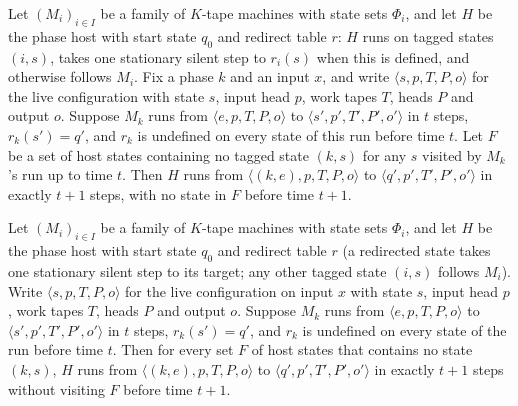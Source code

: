 \begin{theorem}
\label{Turing.NTimeDiag.qy_hosted'}
\leanok
{}
Let $(M_i)_{i \in I}$ be a family of $K$-tape machines with state sets $\Phi_i$, and let $H$ be
the phase host with start state $q_0$ and redirect table $r$: $H$ runs on tagged states
$(i, s)$, takes one stationary silent step to $r_i(s)$ when this is defined, and otherwise
follows $M_i$. Fix a phase $k$ and an input $x$, and write $\langle s, p, T, P, o\rangle$ for the
live configuration with state $s$, input head $p$, work tapes $T$, heads $P$ and output $o$.
Suppose $M_k$ runs from $\langle e, p, T, P, o\rangle$ to $\langle s', p', T', P', o'\rangle$ in
$t$ steps, $r_k(s') = q'$, and $r_k$ is undefined on every state of this run before time $t$.
Let $F$ be a set of host states containing no tagged state $(k, s)$ for any $s$ visited by
$M_k$'s run up to time $t$. Then $H$ runs from $\langle (k, e), p, T, P, o\rangle$ to
$\langle q', p', T', P', o'\rangle$ in exactly $t + 1$ steps, with no state in $F$ before time
$t + 1$.
\end{theorem}

\begin{theorem}
\label{Turing.NTimeDiag.qy_hosted}
\leanok
{}
Let $(M_i)_{i \in I}$ be a family of $K$-tape machines with state sets $\Phi_i$, and let $H$ be
the phase host with start state $q_0$ and redirect table $r$ (a redirected state takes one
stationary silent step to its target; any other tagged state $(i, s)$ follows $M_i$). Write
$\langle s, p, T, P, o\rangle$ for the live configuration on input $x$ with state $s$, input head
$p$, work tapes $T$, heads $P$ and output $o$. Suppose $M_k$ runs from
$\langle e, p, T, P, o\rangle$ to $\langle s', p', T', P', o'\rangle$ in $t$ steps,
$r_k(s') = q'$, and $r_k$ is undefined on every state of the run before time $t$. Then for every
set $F$ of host states that contains no state $(k, s)$, $H$ runs from
$\langle (k, e), p, T, P, o\rangle$ to $\langle q', p', T', P', o'\rangle$ in exactly $t + 1$ steps
without visiting $F$ before time $t + 1$.
\end{theorem}

